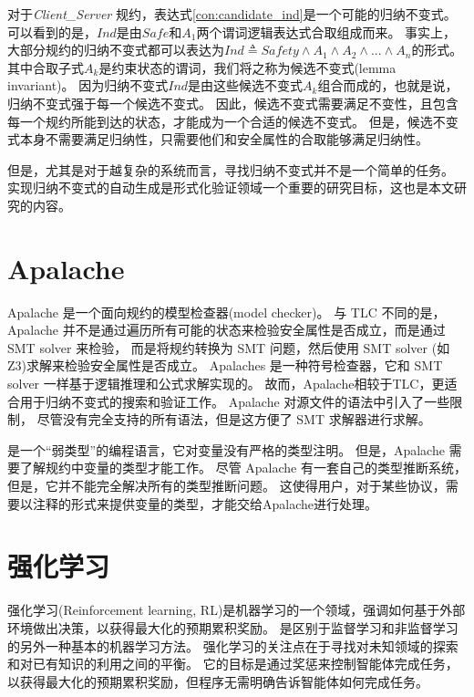 对于\textit{Client\_Server} 规约，表达式\ref{con:candidate_ind}是一个可能的归纳不变式。
可以看到的是，$Ind$是由$Safe$和$A_{1}$两个谓词逻辑表达式合取组成而来。
事实上，大部分规约的归纳不变式都可以表达为$Ind \triangleq Safety \wedge A_1 \wedge A_2 \wedge... \wedge A_n$的形式。
其中合取子式$A_k$是约束状态的谓词，我们将之称为候选不变式(lemma invariant)。
因为归纳不变式$Ind$是由这些候选不变式$A_k$组合而成的，也就是说，归纳不变式强于每一个候选不变式。
因此，候选不变式需要满足不变性，且包含每一个规约所能到达的状态，才能成为一个合适的候选不变式。
但是，候选不变式本身不需要满足归纳性，只需要他们和安全属性的合取能够满足归纳性。

但是，尤其是对于越复杂的系统而言，寻找归纳不变式并不是一个简单的任务。
实现归纳不变式的自动生成是形式化验证领域一个重要的研究目标，这也是本文研究的内容。

\section{Apalache}
Apalache\cite{apalache1, apalache2} 是一个面向\TLA 规约的模型检查器(model checker)。
与 TLC 不同的是，Apalache 并不是通过遍历所有可能的状态来检验安全属性是否成立，而是通过 SMT solver 来检验，
而是将\TLA 规约转换为 SMT 问题，然后使用 SMT solver (如Z3\cite{z3})求解来检验安全属性是否成立。
Apalaches 是一种符号检查器，它和 SMT solver 一样基于逻辑推理和公式求解实现的。
故而，Apalache相较于TLC，更适合用于归纳不变式的搜索和验证工作。
Apalache 对\TLA 源文件的语法中引入了一些限制，
尽管没有完全支持\TLA 的所有语法，但是这方便了 SMT 求解器进行求解。

\TLA 是一个“弱类型”的编程语言，它对变量没有严格的类型注明。
但是，Apalache 需要了解\TLA 规约中变量的类型才能工作。
尽管 Apalache 有一套自己的类型推断系统，但是，它并不能完全解决所有的类型推断问题。
这使得用户，对于某些协议，需要以注释的形式来提供变量的类型，才能交给Apalache进行处理。


\section{强化学习}
强化学习(Reinforcement learning, RL)\cite{rl}是机器学习的一个领域，强调如何基于外部环境做出决策，以获得最大化的预期累积奖励。
是区别于监督学习和非监督学习的另外一种基本的机器学习方法。
强化学习的关注点在于寻找对未知领域的探索和对已有知识的利用之间的平衡。
它的目标是通过奖惩来控制智能体完成任务，以获得最大化的预期累积奖励，但程序无需明确告诉智能体如何完成任务。

